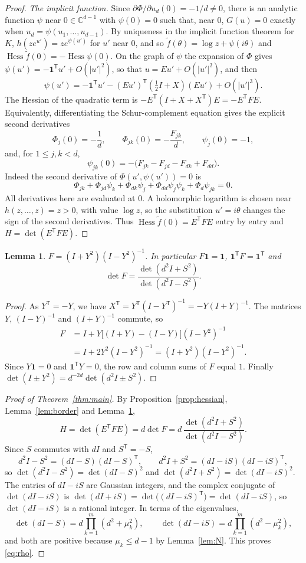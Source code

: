 \documentclass[11pt]{amsart}
\newtheorem{lemma}[theorem]{Lemma}
\theoremstyle{remark}
\numberwithin{equation}{section}
\newcommand{\one}{\mathbf{1}}
\newcommand{\T}{\mathsf{T}}
\newcommand{\Hess}{\operatorname{Hess}}
\begin{document}
\begin{proof}
\emph{The implicit function.} Since $\partial\Phi/\partial u_d(0)=-1/d\ne0$, there is an analytic function $\psi$ near $0\in\mathbb C^{d-1}$ with $\psi(0)=0$ such that, near $0$, $G(u)=0$ exactly when $u_d=\psi(u_1,\dots,u_{d-1})$. By uniqueness in the implicit function theorem for $K$, $h(ze^{u'})=ze^{\psi(u')}$ for $u'$ near $0$, and so $\tilde f(\theta)=\log z+\psi(i\theta)$ and $\Hess\tilde f(0)=-\Hess\psi(0)$. On the graph of $\psi$ the expansion of $\Phi$ gives $\psi(u')=-\one^\T u'+O(|u'|^2)$, so that $u=Eu'+O(|u'|^2)$, and then
\[
\psi(u')=-\one^\T u'-(Eu')^\T(\tfrac12I+X)(Eu')+O(|u'|^3).
\]
The Hessian of the quadratic term is $-E^\T(I+X+X^\T)E=-E^\T FE$. Equivalently, differentiating the Schur-complement equation gives the explicit second derivatives
\[
\Phi_j(0)=-\frac1d,\qquad \Phi_{jk}(0)=-\frac{F_{jk}}d,\qquad \psi_j(0)=-1,
\]
and, for $1\le j,k<d$,
\[
\psi_{jk}(0)=-\bigl(F_{jk}-F_{jd}-F_{dk}+F_{dd}\bigr).
\]
Indeed the second derivative of $\Phi(u',\psi(u'))=0$ is
\[
\Phi_{jk}+\Phi_{jd}\psi_k+\Phi_{dk}\psi_j+\Phi_{dd}\psi_j\psi_k+\Phi_d\psi_{jk}=0.
\]
All derivatives here are evaluated at $0$. A holomorphic logarithm is chosen near $h(z,\dots,z)=z>0$, with value $\log z$, so the substitution $u'=i\theta$ changes the sign of the second derivatives. Thus $\Hess\tilde f(0)=E^\T FE$ entry by entry and $H=\det(E^\T FE)$.
\end{proof}

\begin{lemma}\label{lem:F}
$F=(I+Y^2)(I-Y^2)^{-1}$. In particular $F\one=\one$, $\one^\T F=\one^\T$ and
\[
\det F=\frac{\det(d^2I+S^2)}{\det(d^2I-S^2)}.
\]
\end{lemma}

\begin{proof}
As $Y^\T=-Y$, we have $X^\T=Y^\T(I-Y^\T)^{-1}=-Y(I+Y)^{-1}$. The matrices $Y$, $(I-Y)^{-1}$ and $(I+Y)^{-1}$ commute, so
\begin{align*}
F&=I+Y\bigl[(I+Y)-(I-Y)\bigr](I-Y^2)^{-1}\\
&=I+2Y^2(I-Y^2)^{-1}=(I+Y^2)(I-Y^2)^{-1}.
\end{align*}
Since $Y\one=0$ and $\one^\T Y=0$, the row and column sums of $F$ equal $1$. Finally $\det(I\pm Y^2)=d^{-2d}\det(d^2I\pm S^2)$.
\end{proof}

\begin{proof}[Proof of Theorem~\ref{thm:main}]
By Proposition~\ref{prop:hessian}, Lemma~\ref{lem:border} and Lemma~\ref{lem:F},
\[
H=\det(E^\T FE)=d\det F=d\,\frac{\det(d^2I+S^2)}{\det(d^2I-S^2)}.
\]
Since $S$ commutes with $dI$ and $S^\T=-S$,
\[
d^2I-S^2=(dI-S)(dI-S)^\T,\qquad d^2I+S^2=(dI-iS)(dI-iS)^\T,
\]
so $\det(d^2I-S^2)=\det(dI-S)^2$ and $\det(d^2I+S^2)=\det(dI-iS)^2$. The entries of $dI-iS$ are Gaussian integers, and the complex conjugate of $\det(dI-iS)$ is $\det(dI+iS)=\det\bigl((dI-iS)^\T\bigr)=\det(dI-iS)$, so $\det(dI-iS)$ is a rational integer. In terms of the eigenvalues,
\[
\det(dI-S)=d\prod_{k=1}^m(d^2+\mu_k^2),\qquad \det(dI-iS)=d\prod_{k=1}^m(d^2-\mu_k^2),
\]
and both are positive because $\mu_k\le d-1$ by Lemma~\ref{lem:N}. This proves \eqref{eq:rho}.
\end{proof}
\end{document}
